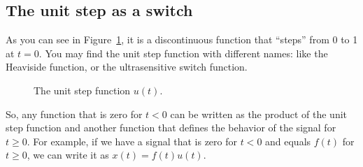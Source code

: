 \subsection{The unit step as a switch}
As you can see in Figure~\ref{fig:unit_step}, it is a discontinuous function that ``steps'' from 0 to 1 at $t = 0$. You may find the unit step function with different names: like the Heaviside function, or the ultrasensitive switch function. 
\begin{figure}[h!]
    \centering
    \caption{The unit step function $u(t)$.}
    \label{fig:unit_step}
\end{figure}

So, any function that is zero for $t < 0$ can be written as the product of the unit step function and another function that defines the behavior of the signal for $t \geq 0$. For example, if we have a signal that is zero for $t < 0$ and equals $f(t)$ for $t \geq 0$, we can write it as $x(t) = f(t)u(t)$.

